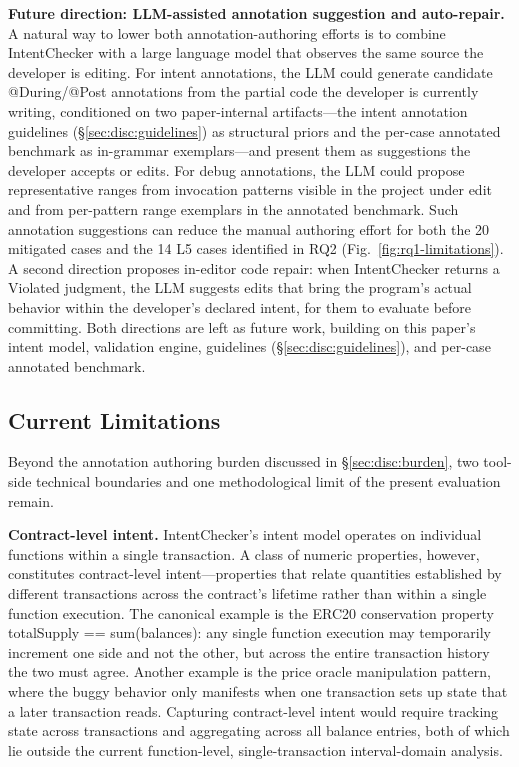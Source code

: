 \documentclass[pdflatex,sn-basic]{sn-jnl}%
\theoremstyle{thmstyleone}%
\theoremstyle{thmstyletwo}%
\theoremstyle{thmstylethree}%
\begin{document}
\smallskip
\noindent\textbf{Future direction: LLM-assisted annotation suggestion and auto-repair.}
A natural way to lower both annotation-authoring efforts is to combine IntentChecker with a large language model that observes the same source the developer is editing.
For intent annotations, the LLM could generate candidate @During/@Post annotations from the partial code the developer is currently writing, conditioned on two paper-internal artifacts---the intent annotation guidelines (§\ref{sec:disc:guidelines}) as structural priors and the per-case annotated benchmark as in-grammar exemplars---and present them as suggestions the developer accepts or edits.
For debug annotations, the LLM could propose representative ranges from invocation patterns visible in the project under edit and from per-pattern range exemplars in the annotated benchmark.
Such annotation suggestions can reduce the manual authoring effort for both the 20 mitigated cases and the 14 L5 cases identified in RQ2 (Fig.~\ref{fig:rq1-limitations}).
A second direction proposes in-editor code repair: when IntentChecker returns a Violated judgment, the LLM suggests edits that bring the program's actual behavior within the developer's declared intent, for them to evaluate before committing.
Both directions are left as future work, building on this paper's intent model, validation engine, guidelines (§\ref{sec:disc:guidelines}), and per-case annotated benchmark.

\subsection{Current Limitations}\label{sec:disc:tech}

Beyond the annotation authoring burden discussed in §\ref{sec:disc:burden}, two tool-side technical boundaries and one methodological limit of the present evaluation remain.

\smallskip
\noindent\textbf{Contract-level intent.}
IntentChecker's intent model operates on individual functions within a single transaction.
A class of numeric properties, however, constitutes contract-level intent---properties that relate quantities established by different transactions across the contract's lifetime rather than within a single function execution.
The canonical example is the ERC20 conservation property totalSupply == sum(balances): any single function execution may temporarily increment one side and not the other, but across the entire transaction history the two must agree.
Another example is the price oracle manipulation pattern, where the buggy behavior only manifests when one transaction sets up state that a later transaction reads.
Capturing contract-level intent would require tracking state across transactions and aggregating across all balance entries, both of which lie outside the current function-level, single-transaction interval-domain analysis.
\end{document}
